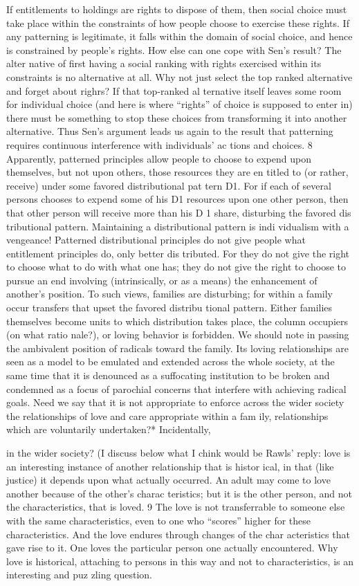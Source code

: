 \documentclass[11pt,openany]{book}
\begin{document}
If entitlements to holdings are rights to dispose of them, then social choice must take place within the constraints of how people choose to exercise these rights. If any patterning is legitimate, it falls within the domain of social choice, and hence is constrained by people's rights. How else can one cope with Sen's result? The alter native of first having a social ranking with rights exercised within its constraints is no alternative at all. Why not just select the top ranked alternative and forget about righrs? If that top-ranked al ternative itself leaves some room for individual choice (and here is where ``rights'' of choice is supposed to enter in) there must be something to stop these choices from transforming it into another alternative. Thus Sen's argument leads us again to the result that patterning requires continuous interference with individuals' ac tions and choices. 8 Apparently, patterned principles allow people to choose to expend upon themselves, but not upon others, those resources they are en titled to (or rather, receive) under some favored distributional pat tern D1. For if each of several persons chooses to expend some of his D1 resources upon one other person, then that other person will receive more than his D 1 share, disturbing the favored dis tributional pattern. Maintaining a distributional pattern is indi vidualism with a vengeance! Patterned distributional principles do not give people what entitlement principles do, only better dis tributed. For they do not give the right to choose what to do with what one has; they do not give the right to choose to pursue an end involving (intrinsically, or as a means) the enhancement of another's position. To such views, families are disturbing; for within a family occur transfers that upset the favored distribu tional pattern. Either families themselves become units to which distribution takes place, the column occupiers (on what ratio nale?), or loving behavior is forbidden. We should note in passing the ambivalent position of radicals toward the family. Its loving relationships are seen as a model to be emulated and extended across the whole society, at the same time that it is denounced as a suffocating institution to be broken and condemned as a focus of parochial concerns that interfere with achieving radical goals. Need we say that it is not appropriate to enforce across the wider society the relationships of love and care appropriate within a fam ily, relationships which are voluntarily undertaken?* Incidentally, 

in the wider society? (I discuss below what I chink would be Rawls' reply: love is an interesting instance of another relationship that is histor ical, in that (like justice) it depends upon what actually occurred. An adult may come to love another because of the other's charac teristics; but it is the other person, and not the characteristics, that is loved. 9 The love is not transferrable to someone else with the same characteristics, even to one who ``scores'' higher for these characteristics. And the love endures through changes of the char acteristics that gave rise to it. One loves the particular person one actually encountered. Why love is historical, attaching to persons in this way and not to characteristics, is an interesting and puz zling question. 
\end{document}
